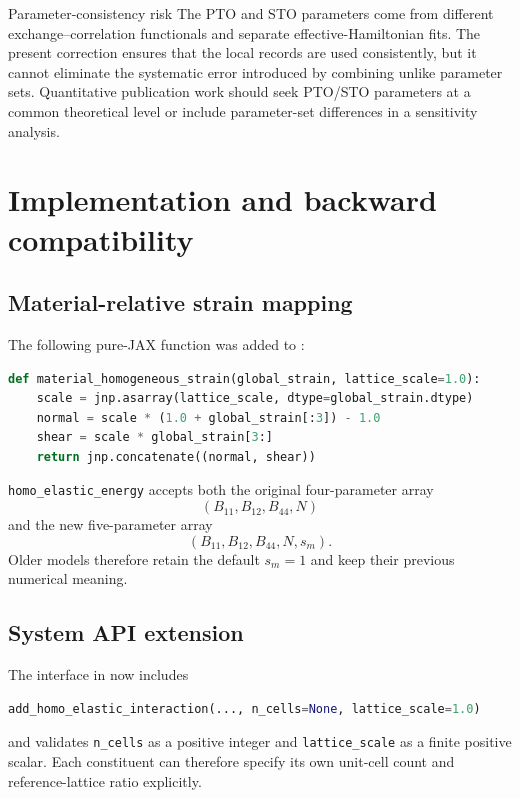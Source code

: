 \documentclass[11pt,a4paper]{article}
\begin{document}
\begin{warnbox}{Parameter-consistency risk}
The PTO and STO parameters come from different exchange--correlation functionals and separate effective-Hamiltonian fits. The present correction ensures that the local records are used consistently, but it cannot eliminate the systematic error introduced by combining unlike parameter sets. Quantitative publication work should seek PTO/STO parameters at a common theoretical level or include parameter-set differences in a sensitivity analysis.
\end{warnbox}

\section{Implementation and backward compatibility}

\subsection{Material-relative strain mapping}
The following pure-JAX function was added to :
\begin{lstlisting}[style=audit,language=Python]
def material_homogeneous_strain(global_strain, lattice_scale=1.0):
    scale = jnp.asarray(lattice_scale, dtype=global_strain.dtype)
    normal = scale * (1.0 + global_strain[:3]) - 1.0
    shear = scale * global_strain[3:]
    return jnp.concatenate((normal, shear))
\end{lstlisting}
\texttt{homo\_elastic\_energy} accepts both the original four-parameter array
\begin{equation}
 (B_{11},B_{12},B_{44},N)
\end{equation}
and the new five-parameter array
\begin{equation}
 (B_{11},B_{12},B_{44},N,s_m).
\end{equation}
Older models therefore retain the default $s_m=1$ and keep their previous numerical meaning.

\subsection{System API extension}
The interface in  now includes
\begin{lstlisting}[style=audit,language=Python]
add_homo_elastic_interaction(..., n_cells=None, lattice_scale=1.0)
\end{lstlisting}
and validates \texttt{n\_cells} as a positive integer and \texttt{lattice\_scale} as a finite positive scalar. Each constituent can therefore specify its own unit-cell count and reference-lattice ratio explicitly.
\end{document}
